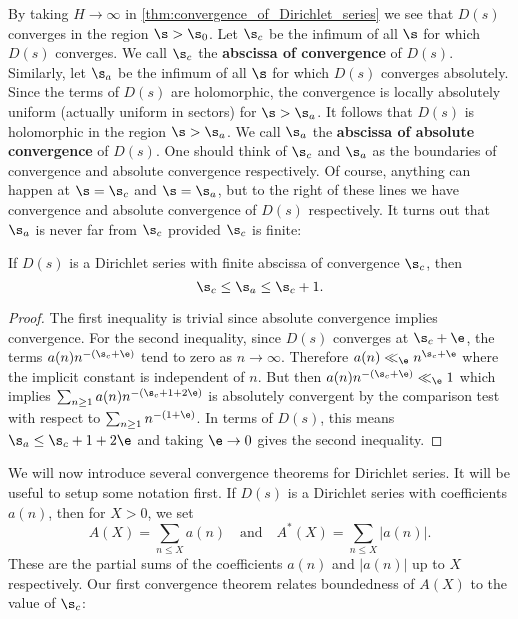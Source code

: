    By taking $H \to \infty$ in \cref{thm:convergence_of_Dirichlet_series} we see that $D(s)$ converges in the region $\s > \s_{0}$. Let $\s_{c}$ be the infimum of all $\s$ for which $D(s)$ converges. We call $\s_{c}$ the \textbf{abscissa of convergence} of $D(s)$. Similarly, let $\s_{a}$ be the infimum of all $\s$ for which $D(s)$ converges absolutely. Since the terms of $D(s)$ are holomorphic, the convergence is locally absolutely uniform (actually uniform in sectors) for $\s > \s_{a}$. It follows that $D(s)$ is holomorphic in the region $\s > \s_{a}$.  We call $\s_{a}$ the \textbf{abscissa of absolute convergence} of $D(s)$. One should think of $\s_{c}$ and $\s_{a}$ as the boundaries of convergence and absolute convergence respectively. Of course, anything can happen at $\s = \s_{c}$ and $\s = \s_{a}$, but to the right of these lines we have convergence and absolute convergence of $D(s)$ respectively. It turns out that $\s_{a}$ is never far from $\s_{c}$ provided $\s_{c}$ is finite:

    \begin{theorem}
      If $D(s)$ is a Dirichlet series with finite abscissa of convergence $\s_{c}$, then
      \[
        \s_{c} \le \s_{a} \le \s_{c}+1.
      \]
    \end{theorem}
    \begin{proof}
      The first inequality is trivial since absolute convergence implies convergence. For the second inequality, since $D(s)$ converges at $\s_{c}+\e$, the terms $a(n)n^{-(\s_{c}+\e)}$ tend to zero as $n \to \infty$. Therefore $a(n) \ll_{\e} n^{\s_{c}+\e}$ where the implicit constant is independent of $n$. But then $a(n)n^{-(\s_{c}+\e)} \ll_{\e} 1$ which implies $\sum_{n \ge 1}a(n)n^{-(\s_{c}+1+2\e)}$ is absolutely convergent by the comparison test with respect to $\sum_{n \ge 1}n^{-(1+\e)}$. In terms of $D(s)$, this means $\s_{a} \le \s_{c}+1+2\e$ and taking $\e \to 0$ gives the second inequality.
    \end{proof}

    We will now introduce several convergence theorems for Dirichlet series. It will be useful to setup some notation first. If $D(s)$ is a Dirichlet series with coefficients $a(n)$, then for $X > 0$, we set
    \[
      A(X) = \sum_{n \le X}a(n) \quad \text{and} \quad A^{\ast}(X) = \sum_{n \le X}|a(n)|.
    \]
    These are the partial sums of the coefficients $a(n)$ and $|a(n)|$ up to $X$ respectively. Our first convergence theorem relates boundedness of $A(X)$ to the value of $\s_{c}$: 
    
